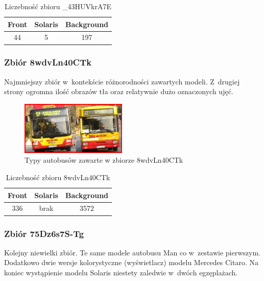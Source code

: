 \begin{table}[!h]
    \centering
    \begin{tabular}{c|c|c}
        Front   & Solaris   & Background \\ \hline
        44      & 5         & 197 
    \end{tabular}
    \caption{Liczebność zbioru \_43HUVkrA7E}
    \label{tab:_43HUVkrA7E_count}
\end{table}

\subsubsection{Zbiór 8wdvLn40CTk}

Najmniejszy zbiór w~kontekście różnorodności zawartych modeli. Z~drugiej
strony ogromna ilość obrazów tła oraz relatywnie dużo oznaczonych ujęć.

\begin{figure}[!h]
    \centering
    \includegraphics[width=0.45\textwidth]{img/exp_trainig_data_8wd}
    \caption{Typy autobusów zawarte w zbiorze 8wdvLn40CTk}
    \label{fig:8wdvLn40CTk_types}
\end{figure}

\begin{table}[!h]
    \centering
    \begin{tabular}{c|c|c}
        Front   & Solaris   & Background \\ \hline
        336     & brak      & 3572
    \end{tabular}
    \caption{Liczebność zbioru 8wdvLn40CTk}
    \label{tab:8wdvLn40CTk_count}
\end{table}

\subsubsection{Zbiór 75Dz6s7S-Tg}

Kolejny niewielki zbiór. Te same modele autobusu Man co w~zestawie
pierwszym. Dodatkowo dwie wersje kolorystyczne (wyświetlacz) modelu
Mercedes Citaro. Na koniec wystąpienie modelu Solaris niestety zaledwie
w~dwóch egzęplażach.

